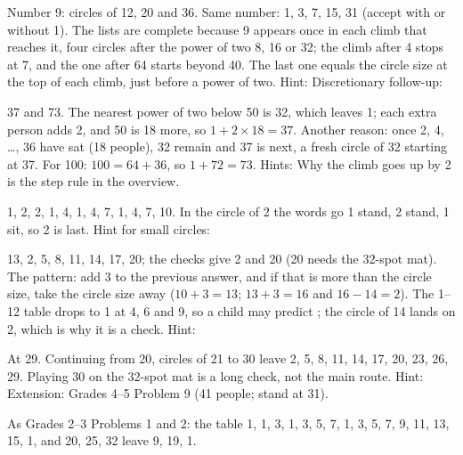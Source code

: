 Number 9: circles of 12, 20 and 36. Same number: 1, 3, 7, 15, 31 (accept with or without 1). The lists are complete because 9 appears once in each climb that reaches it, four circles after the power of two 8, 16 or 32; the climb after 4 stops at 7, and the one after 64 starts beyond 40. The last one equals the circle size at the top of each climb, just before a power of two. Hint:  Discretionary follow-up: 

37 and 73. The nearest power of two below 50 is 32, which leaves 1; each extra person adds 2, and 50 is 18 more, so $1+2\times18=37$. Another reason: once 2, 4, \dots, 36 have sat (18 people), 32 remain and 37 is next, a fresh circle of 32 starting at 37. For 100: $100=64+36$, so $1+72=73$. Hints:   Why the climb goes up by 2 is the step rule in the overview.

1, 2, 2, 1, 4, 1, 4, 7, 1, 4, 7, 10. In the circle of 2 the words go 1 stand, 2 stand, 1 sit, so 2 is last. Hint for small circles: 

13, 2, 5, 8, 11, 14, 17, 20; the checks give 2 and 20 (20 needs the 32-spot mat). The pattern: add 3 to the previous answer, and if that is more than the circle size, take the circle size away ($10+3=13$; $13+3=16$ and $16-14=2$). The 1--12 table drops to 1 at 4, 6 and 9, so a child may predict ; the circle of 14 lands on 2, which is why it is a check. Hint: 

At 29. Continuing from 20, circles of 21 to 30 leave 2, 5, 8, 11, 14, 17, 20, 23, 26, 29. Playing 30 on the 32-spot mat is a long check, not the main route. Hint:  Extension: Grades 4--5 Problem 9 (41 people; stand at 31).

As Grades 2--3 Problems 1 and 2: the table 1, 1, 3, 1, 3, 5, 7, 1, 3, 5, 7, 9, 11, 13, 15, 1, and 20, 25, 32 leave 9, 19, 1.

